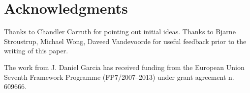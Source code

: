 \section*{Acknowledgments}

Thanks to Chandler Carruth for pointing out initial ideas. Thanks to Bjarne
Stroustrup, Michael Wong, Daveed Vandevoorde for useful feedback prior to the
writing of this paper.

The work from J. Daniel Garcia has received funding from the European Union
Seventh Framework Programme (FP7/2007--2013) under grant agreement n.  609666.
